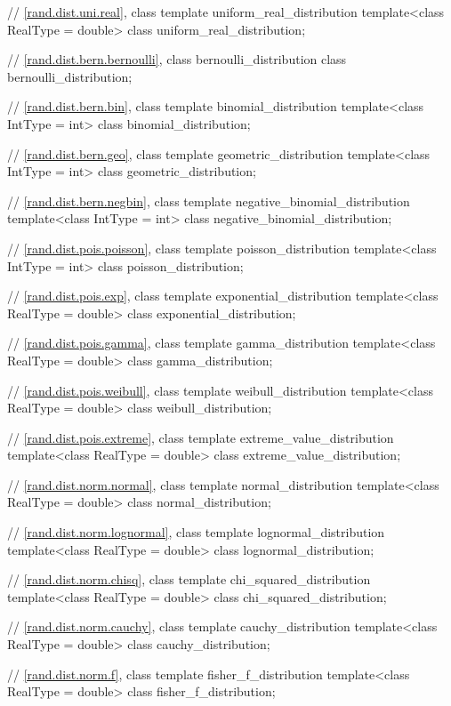 \begin{codeblock}
{ // \ref{rand.dist.uni.real}, class template uniform_real_distribution
 template<class RealType = double>
   class uniform_real_distribution;

 // \ref{rand.dist.bern.bernoulli}, class bernoulli_distribution
 class bernoulli_distribution;

 // \ref{rand.dist.bern.bin}, class template binomial_distribution
 template<class IntType = int>
   class binomial_distribution;

 // \ref{rand.dist.bern.geo}, class template geometric_distribution
 template<class IntType = int>
   class geometric_distribution;

 // \ref{rand.dist.bern.negbin}, class template negative_binomial_distribution
 template<class IntType = int>
   class negative_binomial_distribution;

 // \ref{rand.dist.pois.poisson}, class template poisson_distribution
 template<class IntType = int>
   class poisson_distribution;

 // \ref{rand.dist.pois.exp}, class template exponential_distribution
 template<class RealType = double>
   class exponential_distribution;

 // \ref{rand.dist.pois.gamma}, class template gamma_distribution
 template<class RealType = double>
   class gamma_distribution;

 // \ref{rand.dist.pois.weibull}, class template weibull_distribution
 template<class RealType = double>
   class weibull_distribution;

 // \ref{rand.dist.pois.extreme}, class template extreme_value_distribution
 template<class RealType = double>
   class extreme_value_distribution;

 // \ref{rand.dist.norm.normal}, class template normal_distribution
 template<class RealType = double>
   class normal_distribution;

 // \ref{rand.dist.norm.lognormal}, class template lognormal_distribution
 template<class RealType = double>
   class lognormal_distribution;

 // \ref{rand.dist.norm.chisq}, class template chi_squared_distribution
 template<class RealType = double>
   class chi_squared_distribution;

 // \ref{rand.dist.norm.cauchy}, class template cauchy_distribution
 template<class RealType = double>
   class cauchy_distribution;

 // \ref{rand.dist.norm.f}, class template fisher_f_distribution
 template<class RealType = double>
   class fisher_f_distribution;

}
\end{codeblock}

